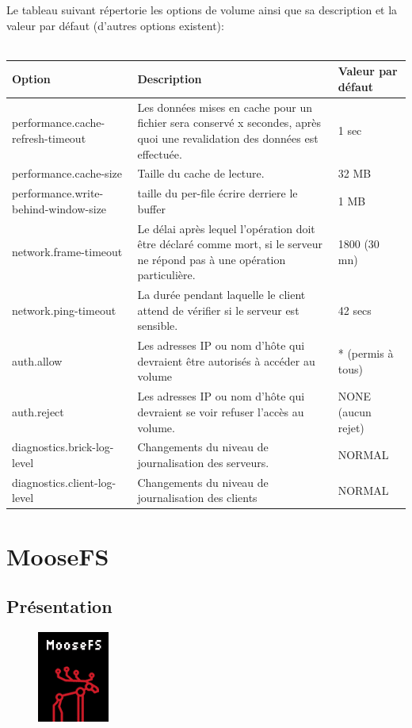\documentclass[12pt]{report}
\begin{document}
Le tableau suivant répertorie les options de volume ainsi que sa description et la valeur par défaut (d'autres options existent):\\\\
\begin{tabular}{|p{5cm}|p{8cm}|m{4cm}|}
  \hline
  Option & Description & Valeur par défaut \\
  \hline
  performance.cache-refresh-timeout & Les données mises en cache pour un fichier sera conservé x secondes, après quoi une revalidation des données est effectuée. & 1 sec \\
  \hline
  performance.cache-size & Taille du cache de lecture. & 32 MB \\
  \hline
  performance.write-behind-window-size & taille du per-file écrire derriere le buffer & 1 MB \\
  \hline
  network.frame-timeout & Le délai après lequel l'opération doit être déclaré comme mort, si le serveur ne répond pas à une opération particulière. & 1800 (30 mn) \\
  \hline
  network.ping-timeout & La durée pendant laquelle le client attend de vérifier si le serveur est sensible. & 42 secs  \\
  \hline
  auth.allow & Les adresses IP ou nom d'hôte qui devraient être autorisés à accéder au volume & * (permis à tous) \\
  \hline
  auth.reject & Les adresses IP ou nom d'hôte qui devraient se voir refuser l'accès au volume. & NONE (aucun rejet) \\
  \hline
  diagnostics.brick-log-level & Changements du niveau de journalisation des serveurs. & NORMAL \\
  \hline
  diagnostics.client-log-level & Changements du niveau de journalisation des clients & NORMAL \\
  \hline
  
\end{tabular}

	\chapter{MooseFS}
		\section{Présentation}

			\begin{figure}[H]
				\begin{center}
					\includegraphics[width=0.15\linewidth]{images/moosefs.png}
				\end{center}
			\end{figure}
	
\end{document}
